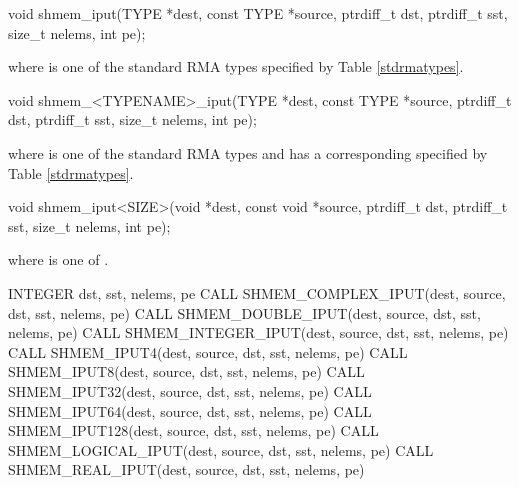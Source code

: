 
\begin{apidefinition}

\begin{C11synopsis}
void shmem_iput(TYPE *dest, const TYPE *source, ptrdiff_t dst, ptrdiff_t sst, size_t nelems, int pe);
\end{C11synopsis}
where \TYPE{} is one of the standard \ac{RMA} types specified by Table \ref{stdrmatypes}.

\begin{Csynopsis}
void shmem_<TYPENAME>_iput(TYPE *dest, const TYPE *source, ptrdiff_t dst, ptrdiff_t sst, size_t nelems, int pe);
\end{Csynopsis}
where \TYPE{} is one of the standard \ac{RMA} types and has a corresponding \TYPENAME{} specified by Table \ref{stdrmatypes}.

\begin{CsynopsisCol}
void shmem_iput<SIZE>(void *dest, const void *source, ptrdiff_t dst, ptrdiff_t sst, size_t nelems, int pe);
\end{CsynopsisCol}
where \SIZE{} is one of .

\begin{DeprecateBlock}
\begin{Fsynopsis}
INTEGER dst, sst, nelems, pe
CALL SHMEM_COMPLEX_IPUT(dest, source, dst, sst, nelems, pe)
CALL SHMEM_DOUBLE_IPUT(dest, source, dst, sst, nelems, pe)
CALL SHMEM_INTEGER_IPUT(dest, source, dst, sst, nelems, pe)
CALL SHMEM_IPUT4(dest, source, dst, sst, nelems, pe)
CALL SHMEM_IPUT8(dest, source, dst, sst, nelems, pe)
CALL SHMEM_IPUT32(dest, source, dst, sst, nelems, pe)
CALL SHMEM_IPUT64(dest, source, dst, sst, nelems, pe)
CALL SHMEM_IPUT128(dest, source, dst, sst, nelems, pe)
CALL SHMEM_LOGICAL_IPUT(dest, source, dst, sst, nelems, pe)
CALL SHMEM_REAL_IPUT(dest, source, dst, sst, nelems, pe)
\end{Fsynopsis}
\end{DeprecateBlock}


\end{apidefinition}

